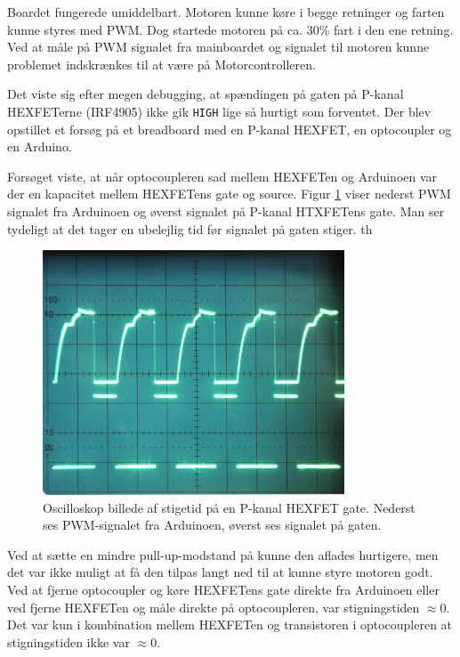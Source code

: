 \documentclass[a4paper,oneside,article,danish,table]{memoir}
\begin{document}

Boardet fungerede umiddelbart. Motoren kunne køre i begge retninger og farten kunne styres med PWM. Dog startede motoren på ca. 30\% fart i den ene retning. Ved at måle på PWM signalet fra mainboardet og signalet til motoren kunne problemet indskrænkes til at være på Motorcontrolleren.

Det viste sig efter megen debugging, at spændingen på gaten på P-kanal HEXFETerne (IRF4905) ikke gik \texttt{HIGH} lige så hurtigt som forventet. Der blev opstillet et forsøg på et breadboard med en P-kanal HEXFET, en optocoupler og en Arduino.

Forsøget viste, at når optocoupleren sad mellem HEXFETen og Arduinoen var der en kapacitet mellem HEXFETens gate og source. Figur \ref{fig:stigetid} viser nederst PWM signalet fra Arduinoen og øverst signalet på P-kanal HTXFETens gate. Man ser tydeligt at det tager en ubelejlig tid før signalet på gaten stiger.
th
\begin{figure}[htbp]
  \centering
  \includegraphics[width=0.8\textwidth]{pictures/stigetid.jpg}
  \caption[Oscilloskop billede af stigetid på en P-kanal HEXFET gate]{Oscilloskop billede af stigetid på en P-kanal HEXFET gate. Nederst ses PWM-signalet fra Arduinoen, øverst ses signalet på gaten.}
  \label{fig:stigetid}
\end{figure}

Ved at sætte en mindre pull-up-modstand på kunne den aflades hurtigere, men det var ikke muligt at få den tilpas langt ned til at kunne styre motoren godt. Ved at fjerne optocoupler og køre HEXFETens gate direkte fra Arduinoen eller ved fjerne HEXFETen og måle direkte på optocoupleren, var stigningstiden $\approx0$. Det var kun i kombination mellem HEXFETen og transistoren i optocoupleren at stigningstiden ikke var $\approx0$.
\end{document}
